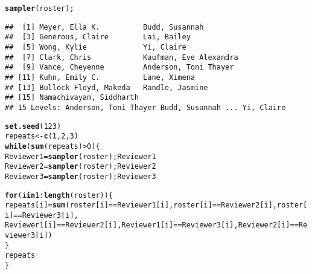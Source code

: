 \documentclass{tufte-handout}\usepackage[]{graphicx}\usepackage[]{color}
\makeatletter
\newcommand{\hlnum}[1]{\textcolor[rgb]{0.686,0.059,0.569}{#1}}%
\newcommand{\hlopt}[1]{\textcolor[rgb]{0,0,0}{#1}}%
\newcommand{\hlstd}[1]{\textcolor[rgb]{0.345,0.345,0.345}{#1}}%
\newcommand{\hlkwa}[1]{\textcolor[rgb]{0.161,0.373,0.58}{\textbf{#1}}}%
\newcommand{\hlkwb}[1]{\textcolor[rgb]{0.69,0.353,0.396}{#1}}%
\newcommand{\hlkwd}[1]{\textcolor[rgb]{0.737,0.353,0.396}{\textbf{#1}}}%
\newenvironment{kframe}{%
 \def\at@end@of@kframe{}%
 \ifinner\ifhmode%
  \def\at@end@of@kframe{\end{minipage}}%
  \begin{minipage}{\columnwidth}%
 \fi\fi%
 \def\FrameCommand##1{\hskip\@totalleftmargin \hskip-\fboxsep
 \colorbox{shadecolor}{##1}\hskip-\fboxsep
     \hskip-\linewidth \hskip-\@totalleftmargin \hskip\columnwidth}%
 \MakeFramed {\advance\hsize-\width
   \@totalleftmargin\z@ \linewidth\hsize
   \@setminipage}}%
 {\par\unskip\endMakeFramed%
 \at@end@of@kframe}
\newenvironment{knitrout}{}{} %
\makeatother
\begin{document}
\begin{knitrout}
\begin{kframe}
\begin{alltt}
\hlkwd{sampler}\hlstd{(roster);}
\end{alltt}
\begin{verbatim}
##  [1] Meyer, Ella K.          Budd, Susannah         
##  [3] Generous, Claire        Lai, Bailey            
##  [5] Wong, Kylie             Yi, Claire             
##  [7] Clark, Chris            Kaufman, Eve Alexandra 
##  [9] Vance, Cheyenne         Anderson, Toni Thayer  
## [11] Kuhn, Emily C.          Lane, Ximena           
## [13] Bullock Floyd, Makeda   Randle, Jasmine        
## [15] Namachivayam, Siddharth
## 15 Levels: Anderson, Toni Thayer Budd, Susannah ... Yi, Claire
\end{verbatim}
\begin{alltt}
\hlkwd{set.seed}\hlstd{(}\hlnum{123}\hlstd{)}
\hlstd{repeats} \hlkwb{<-} \hlkwd{c}\hlstd{(}\hlnum{1}\hlstd{,}\hlnum{2}\hlstd{,}\hlnum{3}\hlstd{)}
\hlkwa{while}\hlstd{(}\hlkwd{sum}\hlstd{(repeats)}\hlopt{>}\hlnum{0}\hlstd{) \{}
\hlstd{Reviewer1}\hlkwb{=}\hlkwd{sampler}\hlstd{(roster); Reviewer1}
\hlstd{Reviewer2}\hlkwb{=}\hlkwd{sampler}\hlstd{(roster); Reviewer2}
\hlstd{Reviewer3}\hlkwb{=}\hlkwd{sampler}\hlstd{(roster); Reviewer3}

\hlkwa{for}\hlstd{(i} \hlkwa{in} \hlnum{1}\hlopt{:}\hlkwd{length}\hlstd{(roster)) \{}
\hlstd{repeats[i]} \hlkwb{=} \hlkwd{sum}\hlstd{(roster[i]}\hlopt{==}\hlstd{Reviewer1[i],roster[i]}\hlopt{==}\hlstd{Reviewer2[i],roster[i]}\hlopt{==}\hlstd{Reviewer3[i],}
\hlstd{Reviewer1[i]}\hlopt{==}\hlstd{Reviewer2[i], Reviewer1[i]}\hlopt{==}\hlstd{Reviewer3[i], Reviewer2[i]}\hlopt{==}\hlstd{Reviewer3[i] )}
\hlstd{\}}
\hlstd{repeats}
\hlstd{\}}


\end{alltt}
\end{kframe}
\end{knitrout}
\end{document}
